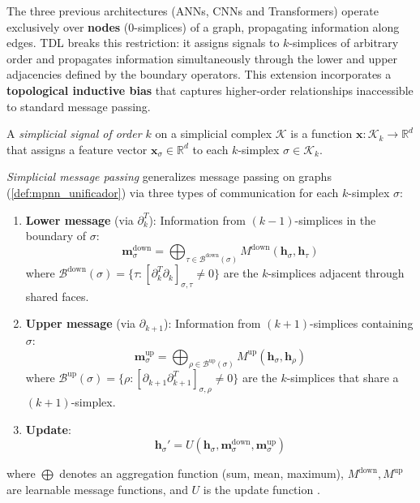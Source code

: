 The three previous architectures (\glspl{ANN}, \glspl{CNN} and \glspl{Transformer}) operate exclusively over \textbf{nodes} ($0$-simplices) of a graph, propagating information along edges. \gls{TDL} breaks this restriction: it assigns signals to $k$-simplices of arbitrary order and propagates information simultaneously through the lower and upper adjacencies defined by the boundary operators. This extension incorporates a \textbf{topological inductive bias} that captures higher-order relationships inaccessible to standard message passing.

\begin{definition}\label{def:senal_simplicial_gdl}
	A \textit{simplicial signal of order $k$} on a simplicial complex $\mathcal{K}$ is a function $\mathbf{x}: \mathcal{K}_k \to \mathbb{R}^d$ that assigns a feature vector $\mathbf{x}_\sigma \in \mathbb{R}^d$ to each $k$-simplex $\sigma \in \mathcal{K}_k$.
\end{definition}

\begin{definition}\label{def:mensaje_simplicial_gdl}
	\textit{Simplicial message passing} generalizes message passing on graphs (\autoref{def:mpnn_unificador}) via three types of communication for each $k$-simplex $\sigma$:
	\begin{enumerate}
		\item \textbf{Lower message} (via $\partial_k^T$): Information from $(k{-}1)$-simplices in the boundary of $\sigma$:
		\[
			\mathbf{m}_\sigma^{\mathrm{down}} = \bigoplus_{\tau \in \mathcal{B}^{\mathrm{down}}(\sigma)} M^{\mathrm{down}}\!\left(\mathbf{h}_\sigma, \mathbf{h}_\tau\right)
		\]
		where $\mathcal{B}^{\mathrm{down}}(\sigma) = \{\tau : [\partial_k^T \partial_k]_{\sigma,\tau} \neq 0\}$ are the $k$-simplices adjacent through shared faces.

		\item \textbf{Upper message} (via $\partial_{k+1}$): Information from $(k{+}1)$-simplices containing $\sigma$:
		\[
			\mathbf{m}_\sigma^{\mathrm{up}} = \bigoplus_{\rho \in \mathcal{B}^{\mathrm{up}}(\sigma)} M^{\mathrm{up}}\!\left(\mathbf{h}_\sigma, \mathbf{h}_\rho\right)
		\]
		where $\mathcal{B}^{\mathrm{up}}(\sigma) = \{\rho : [\partial_{k+1} \partial_{k+1}^T]_{\sigma,\rho} \neq 0\}$ are the $k$-simplices that share a $(k{+}1)$-simplex.

		\item \textbf{Update}:
		\[
			\mathbf{h}_\sigma' = U\!\left(\mathbf{h}_\sigma, \mathbf{m}_\sigma^{\mathrm{down}}, \mathbf{m}_\sigma^{\mathrm{up}}\right)
		\]
	\end{enumerate}
	where $\bigoplus$ denotes an aggregation function (sum, mean, maximum), $M^{\mathrm{down}}, M^{\mathrm{up}}$ are learnable message functions, and $U$ is the update function \citep{bodnar2021weisfeiler}.
\end{definition}

